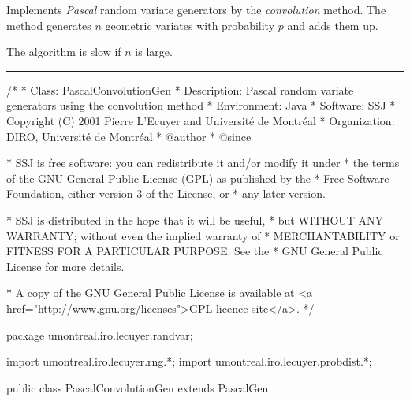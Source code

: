 
Implements \emph{Pascal} random variate generators by
the \emph{convolution} method.
The method generates $n$ geometric variates with probability $p$
and adds them up.

The algorithm is slow if $n$ is large.


\bigskip\hrule


\begin{code}
\begin{hide}
/*
 * Class:        PascalConvolutionGen
 * Description:  Pascal random variate generators using the convolution method
 * Environment:  Java
 * Software:     SSJ 
 * Copyright (C) 2001  Pierre L'Ecuyer and Université de Montréal
 * Organization: DIRO, Université de Montréal
 * @author       
 * @since

 * SSJ is free software: you can redistribute it and/or modify it under
 * the terms of the GNU General Public License (GPL) as published by the
 * Free Software Foundation, either version 3 of the License, or
 * any later version.

 * SSJ is distributed in the hope that it will be useful,
 * but WITHOUT ANY WARRANTY; without even the implied warranty of
 * MERCHANTABILITY or FITNESS FOR A PARTICULAR PURPOSE.  See the
 * GNU General Public License for more details.

 * A copy of the GNU General Public License is available at
   <a href="http://www.gnu.org/licenses">GPL licence site</a>.
 */
\end{hide}
package umontreal.iro.lecuyer.randvar;\begin{hide}
import umontreal.iro.lecuyer.rng.*;
import umontreal.iro.lecuyer.probdist.*;
\end{hide}

public class PascalConvolutionGen extends PascalGen \begin{hide} {
\end{hide}
\end{code}


